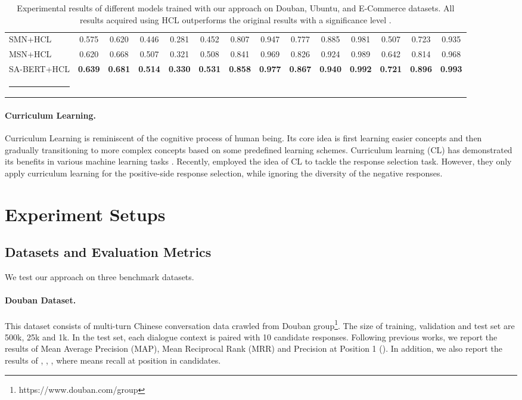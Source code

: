 \documentclass[11pt,a4paper]{article}
\makeatletter
\def\hlinewd#1{\noalign{\ifnum0=`}\fi\hrule \@height #1 \futurelet\reserved@a\@xhline}
\def\hlinewd#1{\noalign{\ifnum0=`}\fi\hrule \@height #1 \futurelet\reserved@a\@xhline}
\makeatother
\begin{document}
\begin{table*}[tb]
{\begin{tabular}{lccccccccccccc}
\hline
SMN+HCL  &0.575  & 0.620 &0.446  &0.281  &0.452  &0.807 &0.947&0.777&0.885&0.981&0.507&0.723&0.935   \\
		MSN+HCL &0.620  &0.668  &0.507  &0.321  &0.508  &0.841 &0.969&0.826&0.924&0.989&0.642&0.814&0.968    \\
		SA-BERT+HCL &\textbf{0.639}  &\textbf{0.681}  &\textbf{0.514}  &\textbf{0.330}  &\textbf{0.531}  &\textbf{0.858}   &\textbf{0.977}&\textbf{0.867}&\textbf{0.940}&\textbf{0.992}&\textbf{0.721}&\textbf{0.896}&\textbf{0.993}   \\
\hlinewd{0.75pt}
	\end{tabular}}
	\caption{Experimental results of different models trained with our approach on Douban, Ubuntu, and E-Commerce datasets. All results acquired using HCL outperforms the original results with a significance level .
}
	\label{tb:main_result}
\end{table*}

\paragraph{Curriculum Learning.} Curriculum Learning \cite{DBLP:conf/icml/BengioLCW09} is reminiscent of the cognitive process of human being. Its core idea is first learning easier concepts and then gradually transitioning to more complex concepts based on some predefined learning schemes. Curriculum learning (CL) has demonstrated its benefits in various machine learning tasks \cite{DBLP:conf/naacl/SpitkovskyAJ10,DBLP:conf/cvpr/IlgMSKDB17,DBLP:conf/bmvc/LiZHXK17,DBLP:conf/aaai/SvetlikLSSWS17,DBLP:conf/ijcai/LiuH0018,DBLP:conf/naacl/PlataniosSNPM19}. Recently, \citet{DBLP:conf/ecir/PenhaH20} employed the idea of CL to tackle the response selection task. However, they only apply curriculum learning for the positive-side response selection, while ignoring the diversity of the negative responses.


\section{Experiment Setups}
\subsection{Datasets and Evaluation Metrics}
We test our approach on three benchmark datasets.

\paragraph{Douban Dataset.} This dataset \cite{DBLP:conf/acl/WuWXZL17} consists of multi-turn Chinese conversation data crawled from Douban group\footnote{https://www.douban.com/group}. The size of training, validation and test set are 500k, 25k and 1k. In the test set, each dialogue context is paired with 10 candidate responses. Following previous works, we report the results of Mean Average Precision (MAP), Mean Reciprocal Rank (MRR) and Precision at Position 1 (). In addition, we also report the results of , , , where  means recall at position  in  candidates. 
\end{document}
